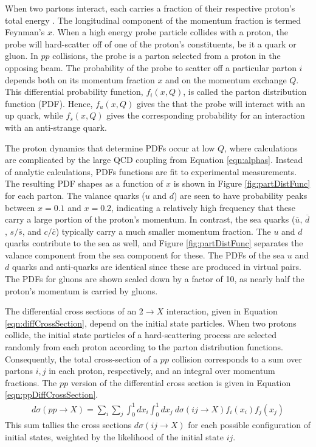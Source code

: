 When two partons interact, each carries a fraction of their respective proton's total energy \sqrts.
The longitudinal component of the momentum fraction is termed Feynman's $x$.
When a high energy probe particle collides with a proton, the probe will hard-scatter off of one of the proton's constituents, be it a quark or gluon.
In $pp$ collisions, the probe is a parton selected from a proton in the opposing beam.
The probability of the probe to scatter off a particular parton $i$ depends both on its momentum fraction $x$ and on the momentum exchange $Q$.
This differential probability function, $f_i(x,Q)$, is called the parton distribution function (PDF).
Hence, $f_u(x,Q)$ gives the that the probe will interact with an up quark, while $f_{\overline{s}}(x,Q)$ gives the corresponding probability for an interaction with an anti-strange quark.

The proton dynamics that determine PDFs occur at low $Q$, where calculations are complicated by the large QCD coupling from Equation \ref{eqn:alphas}.
Instead of analytic calculations, PDFs functions are fit to experimental measurements.
The resulting PDF shapes as a function of $x$ is shown in Figure \ref{fig:partDistFunc} for each parton.
The valance quarks ($u$ and $d$) are seen to have probability peaks between $x=0.1$ and $x=0.2$, indicating a relatively high frequency that these carry a large portion of the proton's momentum.
In contrast, the sea quarks ($\overline{u}$, $\overline{d}$, $s/\overline{s}$, and $c/\overline{c}$) typically carry a much smaller momentum fraction.
The $u$ and $d$ quarks contribute to the sea as well, and Figure \ref{fig:partDistFunc} separates the valance component from the sea component for these.
The PDFs of the sea $u$ and $d$ quarks and anti-quarks are identical since these are produced in virtual pairs.
The PDFs for gluons are shown scaled down by a factor of 10, as nearly half the proton's momentum is carried by gluons.\cite{wells}

The differential cross sections of an $2\to X$ interaction, given in Equation \ref{eqn:diffCrossSection}, depend on the initial state particles.
When two protons collide, the initial state particles of a hard-scattering process are selected randomly from each proton according to the parton distribution functions.
Consequently, the total cross-section of a $pp$ collision corresponds to a sum over partons $i,j$ in each proton, respectively, and an integral over momentum fractions.
The $pp$ version of the differential cross section is given in Equation \ref{eqn:ppDiffCrossSection}.
\begin{equation}\begin{split}\label{eqn:ppDiffCrossSection}
d\sigma(pp\to X)=\sum_i\sum_j\int_0^1dx_i\int_0^1dx_j~d\sigma(ij\to X)f_i(x_i)f_j(x_j)
\end{split}\end{equation} 
This sum tallies the cross sections $d\sigma(ij\to X)$ for each possible configuration of initial states, weighted by the likelihood of the initial state $ij$.


